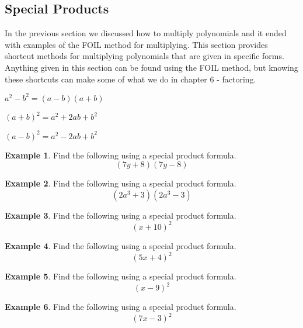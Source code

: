 \documentclass[addpoints,12pt]{exam}
\theoremstyle{definition}
\theoremstyle{break}
\theoremstyle{break}
\newtheorem{example}{Example}[subsection]
\begin{document}
\setcounter{section}{5}
\setcounter{subsection}{2}

\subsection{Special Products}

\vspace{.15in}

In the previous section we discussed how to multiply polynomials and it ended with examples of the FOIL method for multiplying. This section provides shortcut methods for multiplying polynomials that are given in specific forms. Anything given in this section can be found using the FOIL method, but knowing these shortcuts can make some of what we do in chapter 6 - factoring.

\vspace{.15in}

\begin{definition}
$a^2 - b^2 = (a-b)(a+b)$
\end{definition}

\begin{definition}
$(a+b)^2 = a^2 + 2ab + b^2$
\end{definition}

\begin{definition}
$(a-b)^2 = a^2 - 2ab + b^2$
\end{definition}

\vspace{.15in}

\begin{example}
Find the following using a special product formula.
\[ (7y+8)(7y-8)\]
\vspace{.5in}
\end{example}

\begin{example}
Find the following using a special product formula.
\[ (2a^3 + 3)(2a^3 - 3)\]
\vspace{.5in}
\end{example}

\newpage

\begin{example}
Find the following using a special product formula.
\[ (x+10)^2\]
\vspace{.6in}
\end{example}

\begin{example}
Find the following using a special product formula.
\[ (5x+4)^2\]
\vspace{.6in}
\end{example}

\begin{example}
Find the following using a special product formula.
\[ (x-9)^2\]
\vspace{.6in}
\end{example}

\begin{example}
Find the following using a special product formula.
\[ (7x-3)^2\]
\end{example}
\end{document}
